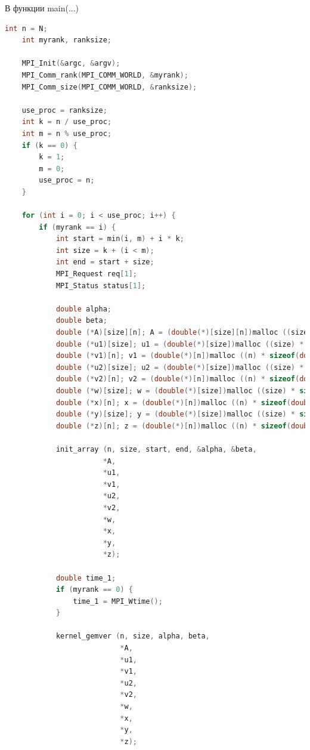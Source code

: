 \documentclass{article}
\begin{document}
\vspace{0.5cm}
В функции main(...)

\begin{lstlisting}[language = C]
    int n = N;
    int myrank, ranksize;

    MPI_Init(&argc, &argv);
    MPI_Comm_rank(MPI_COMM_WORLD, &myrank);
    MPI_Comm_size(MPI_COMM_WORLD, &ranksize);

    use_proc = ranksize;
    int k = n / use_proc;
    int m = n % use_proc;
    if (k == 0) {
        k = 1;
        m = 0;
        use_proc = n;
    }

    for (int i = 0; i < use_proc; i++) {
        if (myrank == i) {
            int start = min(i, m) + i * k;
            int size = k + (i < m);
            int end = start + size;
            MPI_Request req[1];
            MPI_Status status[1];

            double alpha;
            double beta;
            double (*A)[size][n]; A = (double(*)[size][n])malloc ((size) * (n) * sizeof(double));
            double (*u1)[size]; u1 = (double(*)[size])malloc ((size) * sizeof(double));
            double (*v1)[n]; v1 = (double(*)[n])malloc ((n) * sizeof(double));
            double (*u2)[size]; u2 = (double(*)[size])malloc ((size) * sizeof(double));
            double (*v2)[n]; v2 = (double(*)[n])malloc ((n) * sizeof(double));
            double (*w)[size]; w = (double(*)[size])malloc ((size) * sizeof(double));
            double (*x)[n]; x = (double(*)[n])malloc ((n) * sizeof(double));
            double (*y)[size]; y = (double(*)[size])malloc ((size) * sizeof(double));
            double (*z)[n]; z = (double(*)[n])malloc ((n) * sizeof(double));

            init_array (n, size, start, end, &alpha, &beta,
                       *A,
                       *u1,
                       *v1,
                       *u2,
                       *v2,
                       *w,
                       *x,
                       *y,
                       *z);

            double time_1;
            if (myrank == 0) {
                time_1 = MPI_Wtime();
            }

            kernel_gemver (n, size, alpha, beta,
                           *A,
                           *u1,
                           *v1,
                           *u2,
                           *v2,
                           *w,
                           *x,
                           *y,
                           *z);


\end{lstlisting}
\end{document}
